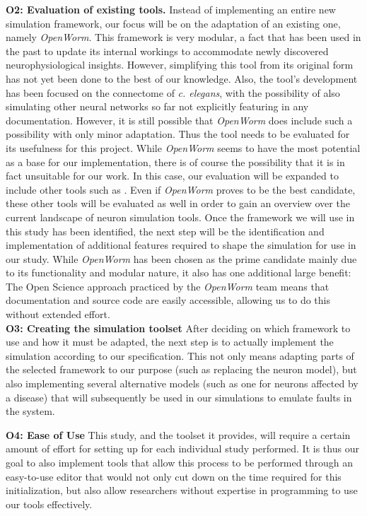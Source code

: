\documentclass[a4paper,11pt]{article}
\begin{document}
\textbf{O2: Evaluation of existing tools.} 
Instead of implementing an entire new simulation framework, our focus will be on the adaptation of an existing one, namely \emph{OpenWorm}. This framework is very modular, a fact that has been used in the past to update its internal workings to accommodate newly discovered neurophysiological insights. However, simplifying this tool from its original form has not yet been done to the best of our knowledge. Also, the tool's development has been focused on the connectome of \emph{c. elegans}, with the possibility of also simulating other neural networks so far not explicitly featuring in any documentation. However, it is still possible that \emph{OpenWorm} does include such a possibility with only minor adaptation. Thus the tool needs to be evaluated for its usefulness for this project.
While \emph{OpenWorm} seems to have the most potential as a base for our implementation, there is of course the possibility that it is in fact unsuitable for our work. In this case, our evaluation will be expanded to include other tools such as . Even if \emph{OpenWorm} proves to be the best candidate, these other tools will be evaluated as well in order to gain an overview over the current landscape of neuron simulation tools.
Once the framework we will use in this study has been identified, the next step will be the identification and implementation of additional features required to shape the simulation for use in our study.
While \emph{OpenWorm} has been chosen as the prime candidate mainly due to its functionality and modular nature, it also has one additional large benefit: The Open Science approach practiced by the \emph{OpenWorm} team means that documentation and source code are easily accessible, allowing us to do this without extended effort.
\\[0.2cm]

\textbf{O3: Creating the simulation toolset}
After deciding on which framework to use and how it must be adapted, the next step is to actually implement the simulation according to our specification. This not only means adapting parts of the selected framework to our purpose (such as replacing the neuron model), but also implementing several alternative models (such as one for neurons affected by a disease) that will subsequently be used in our simulations to emulate faults in the system.


\textbf{O4: Ease of Use}
This study, and the toolset it provides, will require a certain amount of effort for setting up for each individual study performed. It is thus our goal to also implement tools that allow this process to be performed through an easy-to-use editor that would not only cut down on the time required for this initialization, but also allow researchers without expertise in programming to use our tools effectively. 
\end{document}
